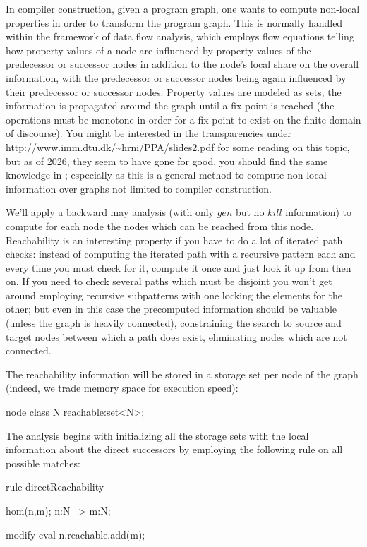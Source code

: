 In compiler construction, given a program graph, one wants to compute non-local properties in order to transform the program graph.
This is normally handled within the framework of data flow analysis, which employs flow equations telling how property values of a node are influenced by property values of the predecessor or successor nodes in addition to the node's local share on the overall information, with the predecessor or successor nodes being again influenced by their predecessor or successor nodes.
Property values are modeled as sets; the information is propagated around the graph until a fix point is reached (the operations must be monotone in order for a fix point to exist on the finite domain of discourse).
You might be interested in the transparencies under \url{http://www.imm.dtu.dk/~hrni/PPA/slides2.pdf} for some reading on this topic, but as of 2026, they seem to have gone for good, you should find the same knowledge in \cite{dataflowanalysis};
especially as this is a general method to compute non-local information over graphs not limited to compiler construction.

We'll apply a backward may analysis (with only $gen$ but no $kill$ information) to compute for each node the nodes which can be reached from this node.
Reachability is an interesting property if you have to do a lot of iterated path checks:
instead of computing the iterated path with a recursive pattern each and every time you must check for it,
compute it once and just look it up from then on.
If you need to check several paths which must be disjoint you won't get around employing recursive subpatterns with one locking the elements for the other; but even in this case the precomputed information should be valuable (unless the graph is heavily connected), constraining the search to source and target nodes between which a path does exist, eliminating nodes which are not connected.

The reachability information will be stored in a storage set per node of the graph (indeed, we trade memory space for execution speed):
  \begin{example}
    \begin{grgen}
node class N
{
	reachable:set<N>;
}
    \end{grgen}
  \end{example}

The analysis begins with initializing all the storage sets with the local information about the direct successors by employing the following rule on all possible matches:
  \begin{example}
    \begin{grgen}
rule directReachability
{
  hom(n,m);
  n:N --> m:N;

  modify {
    eval { n.reachable.add(m); }
  }
}
    \end{grgen}
  \end{example}


